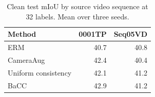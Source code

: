 \begin{table}[t]
\centering
\caption{Clean test mIoU by source video sequence at 32 labels. Mean over three seeds.}
\label{tab:sequences}
\small
\begin{tabular}{lrr}
\toprule
Method & 0001TP & Seq05VD \\
\midrule
ERM & 40.7 & 40.8 \\
CameraAug & 42.4 & 40.4 \\
Uniform consistency & 42.1 & 41.2 \\
BaCC & 42.9 & 41.2 \\
\bottomrule
\end{tabular}
\end{table}
